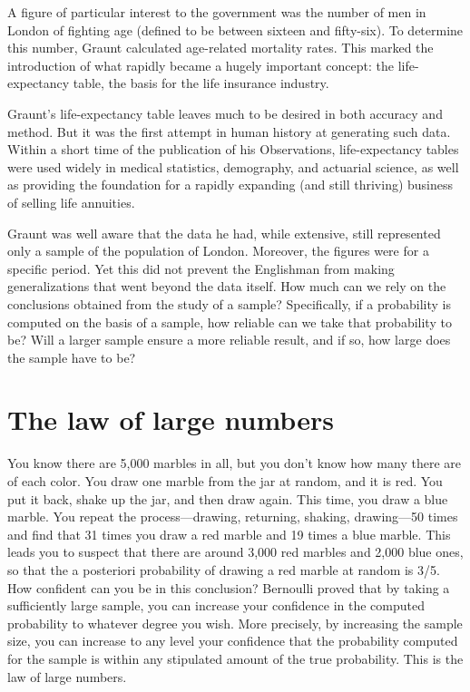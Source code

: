 A figure of particular interest to the government was the number of men in London of fighting age (defined to be between sixteen and fifty-six). To determine this number, Graunt calculated age-related mortality rates. This marked the introduction of what rapidly became a hugely important concept: the life-expectancy table, the basis for the life insurance industry.

Graunt’s life-expectancy table leaves much to be desired in both accuracy and method. But it was the first attempt in human history at generating such data. Within a short time of the publication of his Observations, life-expectancy tables were used widely in medical statistics, demography, and actuarial science, as well as providing the foundation for a rapidly expanding (and still thriving) business of selling life annuities.

Graunt was well aware that the data he had, while extensive, still represented only a sample of the population of London. Moreover, the figures were for a specific period. Yet this did not prevent the Englishman from making generalizations that went beyond the data itself. How much can we rely on the conclusions obtained from the study of a sample? Specifically, if a probability is computed on the basis of a sample, how reliable can we take that probability to be? Will a larger sample ensure a more reliable result, and if so, how large does the sample have to be?

\section{The law of large numbers}
You know there are 5,000 marbles in all, but you don’t know how many there are of each color. You draw one marble from the jar at random, and it is red. You put it back, shake up the jar, and then draw again. This time, you draw a blue marble. You repeat the process—drawing, returning, shaking, drawing—50 times and find that 31 times you draw a red marble and 19 times a blue marble. This leads you to suspect that there are around 3,000 red marbles and 2,000 blue ones, so that the a posteriori probability of drawing a red marble at random is 3/5. How confident can you be in this conclusion? Bernoulli proved that by taking a sufficiently large sample, you can increase your confidence in the computed probability to whatever degree you wish. More precisely, by increasing the sample size, you can increase to any level your confidence that the probability computed for the sample is within any stipulated amount of the true probability. This is the law of large numbers.

